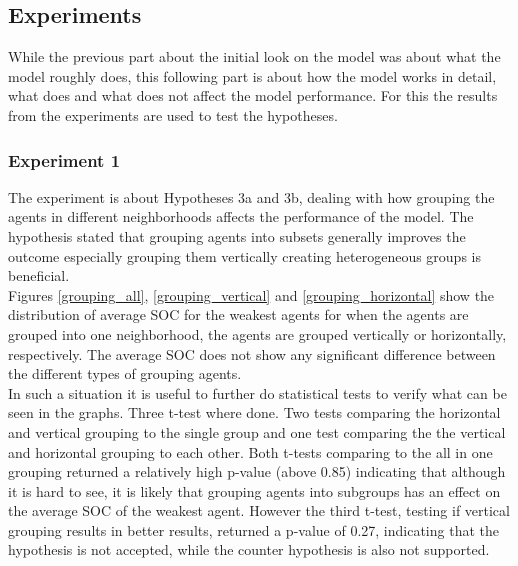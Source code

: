 \documentclass[a4paper]{article}
\begin{document}
\subsection{Experiments}
While the previous part about the initial look on the model was about what the model roughly does, this following part is about 
how the model works in detail, what does and what does not affect the model performance. For this the results from the 
experiments are used to test the hypotheses. 
\subsubsection{Experiment 1}
The experiment is about Hypotheses 3a and 3b, dealing with how grouping the agents in different neighborhoods affects the performance
of the model. The hypothesis stated that grouping agents into subsets generally improves the outcome especially grouping them vertically 
creating heterogeneous groups is beneficial.\\
Figures \ref{grouping_all}, \ref{grouping_vertical} and \ref{grouping_horizontal} show the distribution of average SOC for the 
weakest agents for when the agents are grouped into one neighborhood, the agents are grouped vertically or horizontally, respectively. 
The average SOC does not show any significant difference between the different types of grouping agents.\\
In such a situation it is
useful to further do statistical tests to verify what can be seen in the graphs. Three t-test where done. Two tests 
comparing the horizontal and vertical grouping to the single group and one test comparing the the vertical and horizontal grouping to each 
other. Both t-tests comparing to the all in one grouping returned a relatively high p-value (above 0.85) indicating that 
although it is hard to see, it is likely that grouping agents into subgroups has an effect on the average SOC of the weakest agent.
However the third t-test, testing if vertical grouping results in better results, returned a p-value of 0.27, indicating that the 
hypothesis is not accepted, while the counter hypothesis is also not supported. \\
\end{document}
